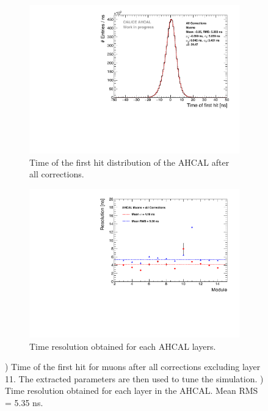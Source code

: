 \begin{figure}[htbp!]
	\begin{subfigure}[t]{0.45\textwidth}
		\centering
		\includegraphics[width=1\textwidth]{chap5/fig_AHCAL_timing/Muons/Timing_AllLayers.pdf}
		\caption{Time of the first hit distribution of the AHCAL after all corrections.}\label{fig:timing_muons}
	\end{subfigure}
	\hfill
	\begin{subfigure}[t]{0.45\textwidth}
		\centering
		\includegraphics[width=1\textwidth]{chap5/fig_AHCAL_timing/Muons/ResolutionPerModule_AllCorrection.pdf}
		\caption{Time resolution obtained for each AHCAL layers.}\label{fig:timing_reso_all_muons}
	\end{subfigure}
	\caption{) Time of the first hit for muons after all corrections excluding layer 11. The extracted parameters are then used to tune the simulation. ) Time resolution obtained for each layer in the AHCAL. Mean RMS = 5.35 ns.}
\end{figure}

